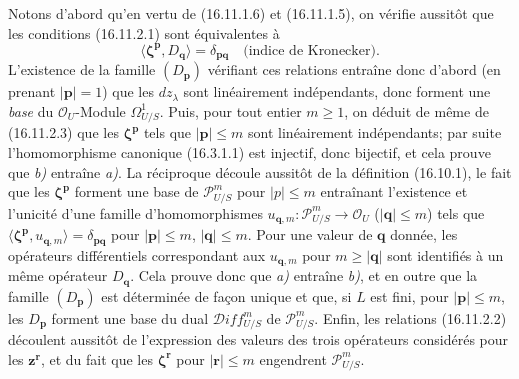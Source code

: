 Notons d'abord qu'en vertu de (16.11.1.6) et (16.11.1.5), on vérifie aussitôt
que les conditions (16.11.2.1) sont équivalentes à
\[
  \langle\boldsymbol{\zeta}^{\mathbf{p}},D_{\mathbf{q}}\rangle
  =\delta_{\mathbf{p}\mathbf{q}}
  \quad\text{(indice de Kronecker)}.
  \tag{16.11.2.3}
  \label{IV.16.11.2.3}
\]
L'existence de la famille $(D_{\mathbf{p}})$ vérifiant ces relations entraîne
donc d'abord (en prenant $|\mathbf{p}|=1$) que les $dz_\lambda$ sont
linéairement indépendants, donc forment une \emph{base} du
$\mathcal{O}_U$-Module $\Omega_{U/S}^1$. Puis, pour tout entier $m\geq1$, on
déduit de même de (16.11.2.3) que les $\boldsymbol{\zeta}^{\mathbf{p}}$ tels
que $|\mathbf{p}|\leq m$ sont linéairement indépendants; par suite
l'homomorphisme canonique (16.3.1.1) est injectif, donc bijectif, et cela
prouve que \emph{b)} entraîne \emph{a)}. La réciproque découle aussitôt de la définition
(16.10.1), le fait que les $\boldsymbol{\zeta}^{\mathbf{p}}$ forment une base
de $\mathscr{P}_{U/S}^m$ pour $|p|\leq m$ entraînant l'existence et
l'unicité d'une famille d'homomorphismes
$u_{\mathbf{q},m}:\mathscr{P}_{U/S}^m\to\mathcal{O}_U$
($|\mathbf{q}|\leq m$) tels que
$\langle\boldsymbol{\zeta}^{\mathbf{p}},u_{\mathbf{q},m}\rangle
=\delta_{\mathbf{p}\mathbf{q}}$ pour $|\mathbf{p}|\leq m$,
$|\mathbf{q}|\leq m$. Pour une valeur de $\mathbf{q}$ donnée, les opérateurs
différentiels correspondant aux $u_{\mathbf{q},m}$ pour
$m\geq|\mathbf{q}|$ sont identifiés à un même opérateur $D_{\mathbf{q}}$.
Cela prouve donc que \emph{a)} entraîne \emph{b)}, et en outre que la famille
$(D_{\mathbf{p}})$ est déterminée de façon unique et que, si $L$ est fini,
pour $|\mathbf{p}|\leq m$, les $D_{\mathbf{p}}$ forment une base du dual
$\mathscr{D}\!iff_{U/S}^m$ de $\mathscr{P}_{U/S}^m$. Enfin, les relations
(16.11.2.2) découlent aussitôt de l'expression des valeurs des trois
opérateurs considérés pour les $\mathbf{z}^{\mathbf{r}}$, et du fait que les
$\boldsymbol{\zeta}^{\mathbf{r}}$ pour $|\mathbf{r}|\leq m$ engendrent
$\mathscr{P}_{U/S}^m$.


